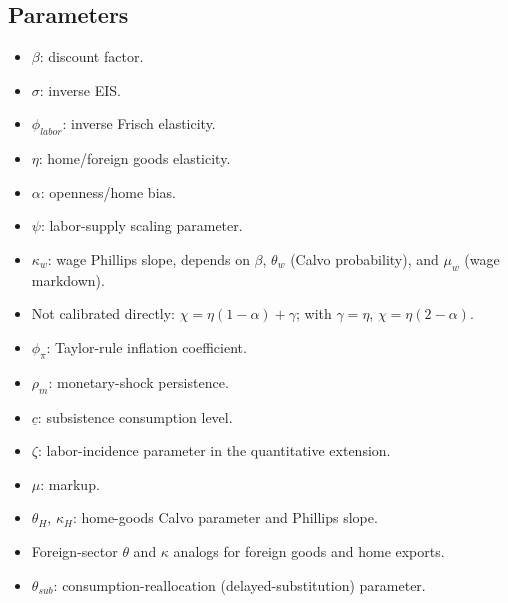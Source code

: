 \documentclass[12pt]{article}
\begin{document}
\subsection{Parameters}
\begin{itemize}
  \item $\beta$: discount factor.
  \item $\sigma$: inverse EIS.
  \item $\phi_{labor}$: inverse Frisch elasticity.
  \item $\eta$: home/foreign goods elasticity.
  \item $\alpha$: openness/home bias.
  \item $\psi$: labor-supply scaling parameter.
  \item $\kappa_w$: wage Phillips slope, depends on $\beta$, $\theta_w$ (Calvo probability), and $\mu_w$ (wage markdown).
  \item Not calibrated directly: $\chi=\eta(1-\alpha)+\gamma$; with $\gamma=\eta$, $\chi=\eta(2-\alpha)$.
  \item $\phi_{\pi}$: Taylor-rule inflation coefficient.
  \item $\rho_m$: monetary-shock persistence.
  \item $\underline{c}$: subsistence consumption level.
  \item $\zeta$: labor-incidence parameter in the quantitative extension.
  \item $\mu$: markup.
  \item $\theta_H$, $\kappa_H$: home-goods Calvo parameter and Phillips slope.
  \item Foreign-sector $\theta$ and $\kappa$ analogs for foreign goods and home exports.
  \item $\theta_{sub}$: consumption-reallocation (delayed-substitution) parameter.
\end{itemize}
\end{document}
